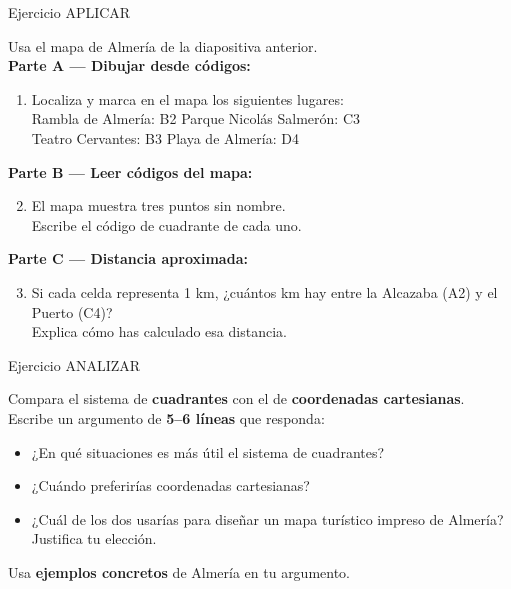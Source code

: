 \documentclass[aspectratio=169, 10pt, spanish]{beamer}
\begin{document}
\begin{frame}{Ejercicio APLICAR}
  \quad{}
  \vspace{4pt}
  \begin{aplicarbox}
    \AlmFontFootnote
    Usa el mapa de Almería de la diapositiva anterior.\\[4pt]
    \textbf{Parte A — Dibujar desde códigos:}
    \begin{enumerate}
      \item Localiza y marca en el mapa los siguientes lugares:\\
        Rambla de Almería: B2 \quad
        Parque Nicolás Salmerón: C3\\
        Teatro Cervantes: B3 \quad
        Playa de Almería: D4
    \end{enumerate}
    \vspace{4pt}
    \textbf{Parte B — Leer códigos del mapa:}
    \begin{enumerate}
      \setcounter{enumi}{1}
      \item El mapa muestra tres puntos sin nombre.\\
        Escribe el código de cuadrante de cada uno.
    \end{enumerate}
    \vspace{4pt}
    \textbf{Parte C — Distancia aproximada:}
    \begin{enumerate}
      \setcounter{enumi}{2}
      \item Si cada celda representa 1 km, ¿cuántos km
        hay entre la Alcazaba (A2) y el Puerto (C4)?\\
        Explica cómo has calculado esa distancia.
    \end{enumerate}
  \end{aplicarbox}
\end{frame}

\begin{frame}{Ejercicio ANALIZAR}
  \quad{}
  \vspace{4pt}
  \begin{analizarbox}
    \AlmFontSmall
    Compara el sistema de \textbf{cuadrantes} con el de
    \textbf{coordenadas cartesianas}.\\[6pt]
    Escribe un argumento de \textbf{5--6 líneas} que responda:
    \begin{itemize}
      \item ¿En qué situaciones es más útil el sistema de cuadrantes?
      \item ¿Cuándo preferirías coordenadas cartesianas?
      \item ¿Cuál de los dos usarías para diseñar un mapa
            turístico impreso de Almería? Justifica tu elección.
    \end{itemize}
    \vspace{4pt}
    Usa \textbf{ejemplos concretos} de Almería en tu argumento.
  \end{analizarbox}
\end{frame}
\end{document}
